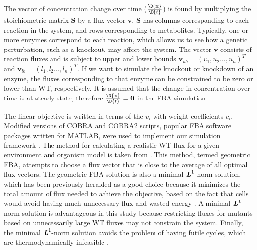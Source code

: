 The vector of concentration change over time
($\frac{\D{\mathbf{x}}}{\D{t}}$) is found by multiplying the
stoichiometric matrix $\mathbf{S}$ by a flux vector
$\mathbf{v}$. $\mathbf{S}$ has columns corresponding to each reaction
in the system, and rows corresponding to metabolites. Typically, one
or more enzymes correspond to each reaction, which allows us to see
how a genetic perturbation, such as a knockout, may affect the
system. The vector $\mathbf{v}$ consists of reaction fluxes and is
subject to upper and lower bounds $\mathbf{v}_{ub} = \left(u_1,u_2
\ldots, u_n\right)^T$ and $\mathbf{v}_{lb} = \left(l_1,l_2 \ldots,
l_n\right)^T$.  If we want to simulate the knockout or knockdown of an
enzyme, the fluxes corresponding to that enzyme can be constrained to
be zero or lower than WT, respectively. It is assumed that the change
in concentration over time is at steady state, therefore
$\frac{\D{\mathbf{x}}}{\D{t}} = \mathbf{0}$ in the FBA simulation
\citep{Smallbone2009a}.

The linear objective is written in terms of the $v_i$ with weight
coefficients $c_i$. Modified versions of COBRA and COBRA2 scripts,
popular FBA software packages written for MATLAB, were used to
implement our simulation framework \citep{Becker2007}. The method for calculating a
realistic WT flux for a given environment and organism model is taken
from \citealt{Smallbone2009a}. This method, termed geometric FBA,
attempts to choose a flux vector that is close to the average of all
optimal flux vectors. The geometric FBA solution is also a minimal
$\textbf{\textit{L}}^1$-norm solution, which has been previously
heralded as a good choice because it minimizes the total amount of
flux needed to achieve the objective, based on the fact that cells
would avoid having much unnecessary flux and wasted energy \citep{Smallbone2009a}. A
minimal $\textbf{\textit{L}}^1$-norm solution is advantageous in this
study because restricting fluxes for mutants based on unnecessarily
large WT fluxes may not constrain the system. Finally, the minimal
$\textbf{\textit{L}}^1$-norm solution avoids the problem of having
futile cycles, which are thermodynamically infeasible \citep{Smallbone2009a}.

